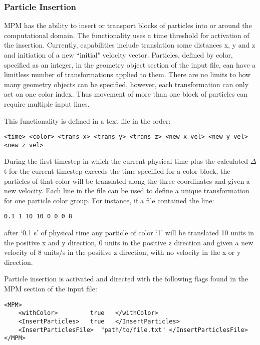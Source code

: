 \subsubsection{Particle Insertion} \label{Sec:ParticleInsert}
MPM has the ability to insert or transport blocks of particles into or
 around the computational domain.  The functionality uses a time threshold for 
activation of the insertion. Currently, capabilities include translation some 
distances x, y and z and initiation of a new ``initial" velocity vector.  Particles, 
defined by color, specified as an integer, in the geometry object section of the 
input file, can have a limitless number of transformations applied to them.  
There are no limits to how many geometry objects can be specified, however,
each transformation can only act on one color index.  Thus movement of more than
one block of particles can require multiple input lines.
 
This functionality is defined in a text file in the order: 

\begin{verbatim}
<time> <color> <trans x> <trans y> <trans z> <new x vel> <new y vel> <new z vel>
\end{verbatim}  

During the first timestep in which the current physical time plus the calculated 
$\Delta$t for the current timestep exceeds the time specified for a color block, the 
particles of that color will be translated along the three coordinates and given 
a new velocity.  Each line in the file can be used to define a unique transformation
for one particle color group.  For instance, if a file contained the line:

\begin{verbatim}
0.1 1 10 10 0 0 0 8 
\end{verbatim}

\noindent after `0.1 s' of physical time any particle of color `1' will be translated 10 
units in the positive x and y direction, 0 units in the positive z direction 
and given a new velocity of 8 units/s in the positive z direction, with no 
velocity in the x or y direction.

Particle insertion is activated and directed with the following flags found in the 
MPM section of the input file:
\begin{verbatim}
<MPM>
    <withColor>         true   </withColor>
    <InsertParticles>   true   </InsertParticles>
    <InsertParticlesFile>  "path/to/file.txt" </InsertParticlesFile>
</MPM>
\end{verbatim}

